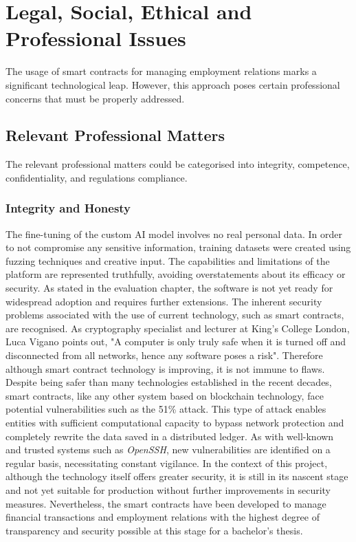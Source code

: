 \chapter{Legal, Social, Ethical and Professional Issues}

The usage of smart contracts for managing employment relations marks a significant technological leap. However, this approach poses certain professional concerns that must be properly addressed. 

\section{Relevant Professional Matters}

The relevant professional matters could be categorised into integrity, competence, confidentiality, and regulations compliance.

\subsection{Integrity and Honesty}

The fine-tuning of the custom AI model involves no real personal data. In order to not compromise any sensitive information, training datasets were created using fuzzing techniques and creative input. The capabilities and limitations of the platform are represented truthfully, avoiding overstatements about its efficacy or security. As stated in the evaluation chapter, the software is not yet ready for widespread adoption and requires further extensions. The inherent security problems associated with the use of current technology, such as smart contracts, are recognised. As cryptography specialist and lecturer at King's College London, Luca Vigano points out, "A computer is only truly safe when it is turned off and disconnected from all networks, hence any software poses a risk". Therefore although smart contract technology is improving, it is not immune to flaws. Despite being safer than many technologies established in the recent decades, smart contracts, like any other system based on blockchain technology, face potential vulnerabilities such as the 51\% attack. This type of attack enables entities with sufficient computational capacity to bypass network protection and completely rewrite the data saved in a distributed ledger. As with well-known and trusted systems such as \textit{OpenSSH}, new vulnerabilities are identified on a regular basis, necessitating constant vigilance. In the context of this project, although the technology itself offers greater security, it is still in its nascent stage and not yet suitable for production without further improvements in security measures. Nevertheless, the smart contracts have been developed to manage financial transactions and employment relations with the highest degree of transparency and security possible at this stage for a bachelor's thesis.

